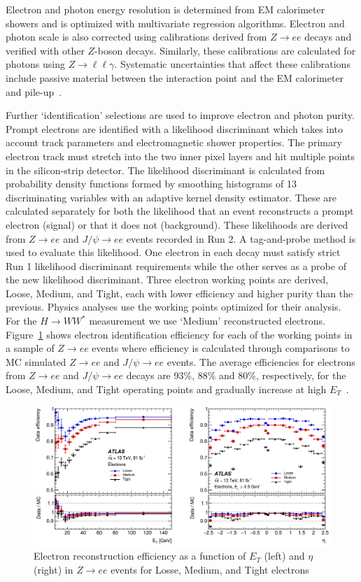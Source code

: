 Electron and photon energy resolution is determined from EM calorimeter showers and is optimized with multivariate regression algorithms. Electron and photon scale is also corrected using calibrations derived from $Z\rightarrow ee$ decays and verified with other $Z$-boson decays. Similarly, these calibrations are calculated for photons using $Z\rightarrow \ell\ell\gamma$. Systematic uncertainties that affect these calibrations include passive material between the interaction point and the EM calorimeter and pile-up~\cite{ElectronPhotonPerformance}. 

Further `identification' selections are used to improve electron and photon purity. Prompt electrons are identified with a likelihood discriminant which takes into account track parameters and electromagnetic shower properties. The primary electron track must stretch into the two inner pixel layers and hit multiple points in the silicon-strip detector. The likelihood discriminant is calculated from probability density functions formed by smoothing histograms of 13 discriminating variables with an adaptive kernel density estimator.  These are calculated separately for both the likelihood that an event reconstructs a prompt electron (signal) or that it does not (background). These likelihoods are derived from $Z\rightarrow ee$ and $J/\psi\rightarrow ee$ events recorded in Run 2. A tag-and-probe method is used to evaluate this likelihood. One electron in each decay must satisfy strict Run 1 likelihood discriminant requirements while the other serves as a probe of the new likelihood discriminant. Three electron working points are derived, Loose, Medium, and Tight, each with lower efficiency and higher purity than the previous. Physics analyses use the working points optimized for their analysis. For the $H\rightarrow WW^*$ measurement we use `Medium' reconstructed electrons. Figure~\ref{fig:ElectronEff} shows electron identification efficiency for each of the working points in a sample of $Z\rightarrow ee$ events where efficiency is calculated through comparisons to MC simulated $Z\rightarrow ee$ and $J/\psi\rightarrow ee$ events. The average efficiencies for electrons from $Z\rightarrow ee$ and $J/\psi\rightarrow ee$ decays are 93\%, 88\% and 80\%, respectively, for the Loose, Medium, and Tight operating points and gradually increase at high $E_T$~\cite{ElectronPhotonPerformance}.

\begin{figure}[!h]
        \centering
    \includegraphics[width=.75\textwidth]{Pictures/ElectroEff.png}
    \caption{ Electron reconstruction efficiency as a function of $E_T$ (left) and $\eta$ (right) in $Z\rightarrow ee$ events for Losse, Medium, and Tight electrons~\cite{ElectronPhotonPerformance}}
    \label{fig:ElectronEff}
\end{figure}

